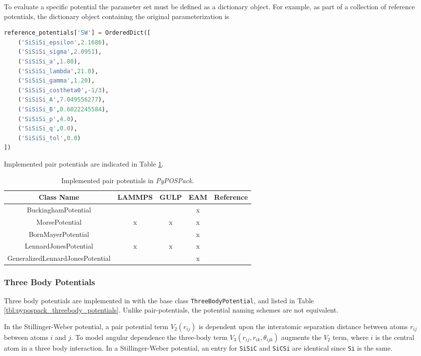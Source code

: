 To evaluate a specific potential the parameter set must be defined as a dictionary object.  For example, as part of a collection of reference potentials, the dictionary object containing the original parameterization is
\begin{lstlisting}[language=Python]
reference_potentials['SW'] = OrderedDict([
    ('SiSiSi_epsilon',2.1686),
    ('SiSiSi_sigma',2.0951),
    ('SiSiSi_a',1.80),
    ('SiSiSi_lambda',21.0),
    ('SiSiSi_gamma',1.20),
    ('SiSiSi_costheta0',-1/3),
    ('SiSiSi_A',7.049556277),
    ('SiSiSi_B',0.6022245584),
    ('SiSiSi_p',4.0),
    ('SiSiSi_q',0.0),
    ('SiSiSi_tol',0.0)
])
\end{lstlisting}

Implemented pair potentials are indicated in Table \ref{tbl:pypospack_pair_potential}.

\begin{table}[ht]
    \centering
    \caption{Implemented pair potentials in \emph{PyPOSPack}.}
    \label{tbl:pypospack_pair_potential}
    \begin{tabular}{ccccc}
	    \hline
	    {Class Name} & LAMMPS & GULP & EAM  & {Reference} \\
	    \hline
	    BuckinghamPotential   &   &   & x & \cite{lewis1985_buckingham,buckingham1938} \\
	    MorsePotential        & x & x & x & \cite{morse1929_morse_potential} \\
	    BornMayerPotential    &   &   & x & \cite{abrahamson1969_bornmayer_potential} \\
	    LennardJonesPotential & x & x & x & \cite{lennardjones1924_lj_pot} \\
	    GeneralizedLennardJonesPotential
	                          &   &   & x & \cite{mishin2004_eam_NiAl} \\
	    \hline
    \end{tabular}
\end{table}

\subsubsection{Three Body Potentials}
Three body potentials are implemented in with the base class \verb|ThreeBodyPotential|, and listed in Table \ref{tbl:pypospack_threebody_potentials}.  Unlike pair-potentials, the potential naming schemes are not equivalent.

In the Stillinger-Weber potential\cite{stillinger1985_sw}, a pair potential term $V_2(r_{ij})$ is dependent upon the interatomic separation distance between atoms $r_{ij}$ between atoms $i$ and $j$.
To model angular dependence the three-body term $V_3(r_{ij},r_{ik},\theta_{ijk})$ augments the $V_2$ term, where $i$ is the central atom in a three body interaction.  In a Stillinger-Weber potential, an entry for \verb|SiSiC| and \verb|SiCSi| are identical since \verb|Si| is the same.

